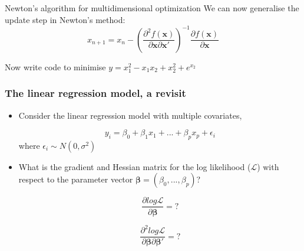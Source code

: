 \documentclass[10pt]{beamer}
\begin{document}
                                                                                              \begin{frame}{Newton's algorithm for multidimensional optimization}
                                                                                                We can now generalise the update step in Newton's method:
                                                                                                \begin{equation}
                                                                                                  x_{n+1}=x_n-\left(\frac{\partial^2 f({\bm x})}{\partial {\bm x}\partial{\bm x}'}\right)^{-1}
                                                                                                  \frac{\partial f({\bm x})}{\partial {\bm x}}
                                                                                                \end{equation}

                                                                                                Now write code to minimise $y=x_1^2-x_1x_2+x_2^2+e^{x_2}$
                                                                                              \end{frame}

\begin{frame}
\frametitle{The linear regression model, a revisit}
\begin{itemize}
\item Consider the linear regression model with multiple covariates,

  \begin{equation*}
    y_i = \beta_0 + \beta_1x_1+...+\beta_p x_p + \epsilon_i
  \end{equation*}
where $\epsilon_i \sim N(0, \sigma^2)$

\item What is the gradient and Hessian matrix for the log likelihood ($\mathcal{L}$)
  with respect to the parameter vector $\bm{\beta}=(\beta_0,...,\beta_p)$?

  \begin{equation*}
    \frac{\partial log \mathcal{L}}{\partial \bm{\beta}} = ?
  \end{equation*}

  \begin{equation*}
    \frac{\partial^2 log \mathcal{L}}{\partial \bm{\beta} \partial \bm{\beta}'}
    = ?
  \end{equation*}

\end{itemize}
\end{frame}
\end{document}
